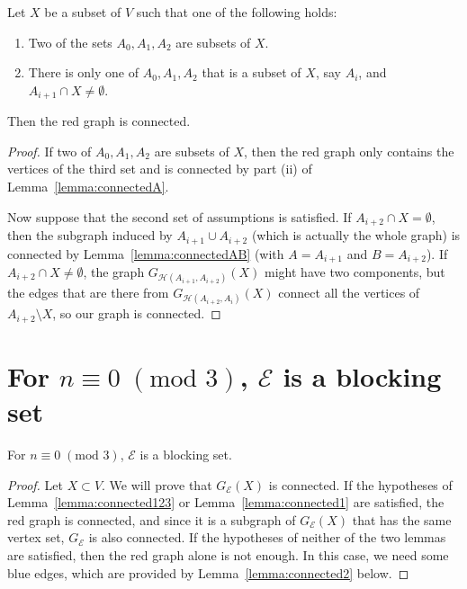 \documentclass[11pt,a4paper]{article}
\begin{document}
\begin{lemma}
\label{lemma:connected1}
    Let $X$ be a subset of $V$ such that one of the following holds:
    \begin{enumerate}
        \item Two of the sets $A_0, A_1, A_2$ are subsets of $X$.
        \item There is only one of $A_0, A_1, A_2$ that is a subset of $X$, say $A_i$, and $A_{i+1} \cap X \neq \emptyset$.
    \end{enumerate}
    Then the red graph is connected.
\end{lemma}


\begin{proof}
    If two of $A_0,A_1,A_2$ are subsets of $X$, then the red graph only contains the vertices of the third set and is connected by part (ii) of Lemma~\ref{lemma:connectedA}.


    Now suppose that the second set of assumptions is satisfied.  If $A_{i+2} \cap X=\emptyset$, then the subgraph induced by $A_{i+1}\cup A_{i+2}$ (which is actually the whole graph) is connected by Lemma~\ref{lemma:connectedAB} (with $A=A_{i+1}$ and $B=A_{i+2}$). If $A_{i+2} \cap X \neq \emptyset$, the graph $G_{\mathcal{H}(A_{i+1},A_{i+2})}(X)$ might have two components, but the edges that are there from $G_{\mathcal{H}(A_{i+2},A_{i})}(X)$ connect all the vertices of $A_{i+2}\setminus X$, so our graph is connected.
\end{proof}

\section{For \texorpdfstring{$n \equiv 0 \; ({\mbox{mod }} 3)$, $\mathcal{E}$}{} is a blocking set}


\begin{theorem}\label{thm:main3k}
    For $n \equiv 0 \; ({\mbox{mod }} 3)$, $\mathcal{E}$ is a blocking set.
\end{theorem}
\begin{proof}%
Let $X\subset V$. We will prove that $G_{\mathcal{E}}(X)$ is connected. If the hypotheses of Lemma~\ref{lemma:connected123} or Lemma~\ref{lemma:connected1} are satisfied, the red graph is connected, and since it is a subgraph of $G_{\mathcal{E}}(X)$ that has the same vertex set, $G_{\mathcal{E}}$ is also connected. If the hypotheses of neither of the two lemmas are satisfied, then the red graph alone is not enough. In this case, we need some blue edges, which are provided by Lemma~\ref{lemma:connected2} below.
\end{proof}
\end{document}
